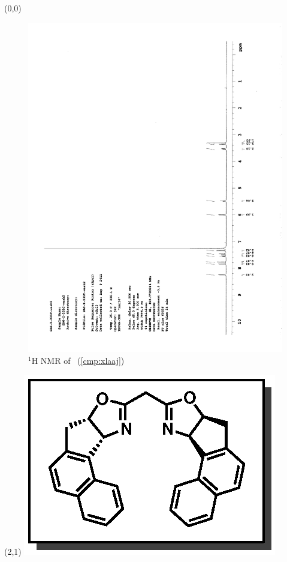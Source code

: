 \begin{textblock}{20}(0,0)
\begin{figure}[htb]
\caption{$^1$H NMR of \CMPxlaaj\ (\ref{cmp:xlaaj})}
\includegraphics[scale=0.75, trim = 0mm 0mm 0mm 5mm,
clip]{chp_asymmetric/images/nmr/xlaajH}
\vspace{-100pt}
\end{figure}
\end{textblock}
\begin{textblock}{1}(2,1)
\includegraphics[scale=0.8, angle=90]{chp_asymmetric/images/xlaaj}
\end{textblock}
